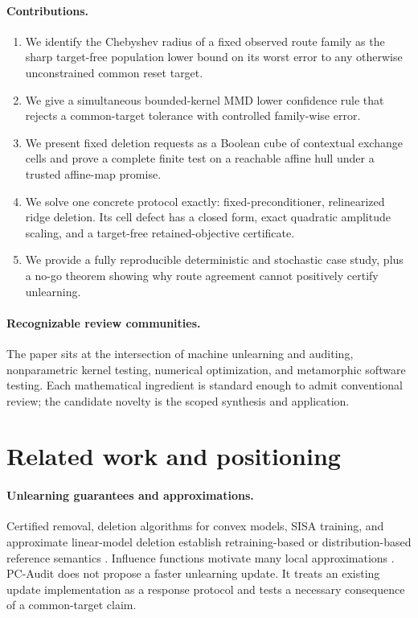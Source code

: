 \documentclass[10pt]{article}
\theoremstyle{definition}
\theoremstyle{remark}
\begin{document}
\paragraph{Contributions.}

\begin{enumerate}
  \item We identify the Chebyshev radius of a fixed observed route family as
  the sharp target-free population lower bound on its worst error to any
  otherwise unconstrained common reset target.
  \item We give a simultaneous bounded-kernel MMD lower confidence rule that
  rejects a common-target tolerance with controlled family-wise error.
  \item We present fixed deletion requests as a Boolean cube of contextual
  exchange cells and prove a complete finite test on a reachable affine hull
  under a trusted affine-map promise.
  \item We solve one concrete protocol exactly: fixed-preconditioner,
  relinearized ridge deletion. Its cell defect has a closed form, exact
  quadratic amplitude scaling, and a target-free retained-objective
  certificate.
  \item We provide a fully reproducible deterministic and stochastic case
  study, plus a no-go theorem showing why route agreement cannot positively
  certify unlearning.
\end{enumerate}

\paragraph{Recognizable review communities.}
The paper sits at the intersection of machine unlearning and auditing,
nonparametric kernel testing, numerical optimization, and metamorphic software
testing. Each mathematical ingredient is standard enough to admit conventional
review; the candidate novelty is the scoped synthesis and application.

\section{Related work and positioning}

\paragraph{Unlearning guarantees and approximations.}
Certified removal, deletion algorithms for convex models, SISA training, and
approximate linear-model deletion establish retraining-based or
distribution-based reference semantics
\citep{guo2020,neel2021,bourtoule2021,izzo2021}. Influence functions motivate
many local approximations \citep{koh2017}. PC-Audit does not propose a faster
unlearning update. It treats an existing update implementation as a response
protocol and tests a necessary consequence of a common-target claim.
\end{document}
